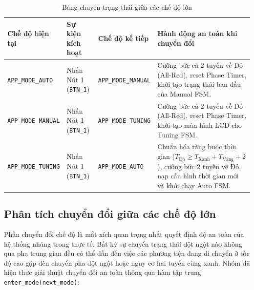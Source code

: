 \begin{table}[H]
\centering
\small
\begin{tabularx}{\textwidth}{|l|l|l|X|}
\hline
\textbf{Chế độ hiện tại} & \textbf{Sự kiện kích hoạt} & \textbf{Chế độ kế tiếp} & \textbf{Hành động an toàn khi chuyển đổi} \\ \hline
\texttt{APP\_MODE\_AUTO} & Nhấn Nút 1 (\texttt{BTN\_1}) & \texttt{APP\_MODE\_MANUAL} & Cưỡng bức cả 2 tuyến về Đỏ (All-Red), reset Phase Timer, khởi tạo trạng thái ban đầu của Manual FSM. \\ \hline
\texttt{APP\_MODE\_MANUAL} & Nhấn Nút 1 (\texttt{BTN\_1}) & \texttt{APP\_MODE\_TUNING} & Cưỡng bức cả 2 tuyến về Đỏ (All-Red), reset Phase Timer, khởi tạo màn hình LCD cho Tuning FSM. \\ \hline
\texttt{APP\_MODE\_TUNING} & Nhấn Nút 1 (\texttt{BTN\_1}) & \texttt{APP\_MODE\_AUTO} & Chuẩn hóa ràng buộc thời gian ($T_{\text{Đỏ}} \ge T_{\text{Xanh}} + T_{\text{Vàng}} + 2$), cưỡng bức 2 tuyến về Đỏ, nạp cấu hình thời gian mới và khởi chạy Auto FSM. \\ \hline
\end{tabularx}
\caption{Bảng chuyển trạng thái giữa các chế độ lớn}
\label{tab:mode_transitions}
\end{table}

\subsection{Phân tích chuyển đổi giữa các chế độ lớn}
Phần chuyển đổi chế độ là mắt xích quan trọng nhất quyết định độ an toàn của hệ thống nhúng trong thực tế. Bất kỳ sự chuyển trạng thái đột ngột nào không qua pha trung gian đều có thể dẫn đến việc các phương tiện đang di chuyển ở tốc độ cao gặp đèn chuyển pha đột ngột hoặc nguy cơ hai tuyến cùng xanh. Nhóm đã hiện thực giải thuật chuyển đổi an toàn thông qua hàm tập trung \texttt{enter\_mode(next\_mode)}:

